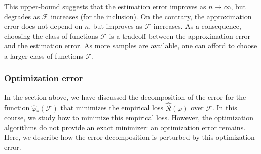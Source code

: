 \documentclass[11pt,reqno]{article}
\newcommand{\cF}{\mathcal{F}}
\newcommand{\cR}{\mathcal{R}}
\numberwithin{equation}{section}
\theoremstyle{plain}
\theoremstyle{definition}
\theoremstyle{remark}
\begin{document}
	This upper-bound suggests that the estimation error improves as $n\to \infty$, but degrades as $\cF$ increases (for the inclusion). On the contrary, the approximation error does not depend on $n$, but improves as $\cF$ increases. As a consequence, choosing the class of functions $\cF$ is a tradeoff between the approximation error and the estimation error. As more samples are available, one can afford to choose a larger class of functions $\cF$. 

	\subsubsection{Optimization error}

	In the section above, we have discussed the decomposition of the error for the function $\widehat{\varphi}_*(\cF)$ that minimizes the empirical loss $\widehat{\cR}(\varphi)$ over $\cF$. In this course, we study how to minimize this empirical loss. However, the optimization algorithms do not provide an exact minimizer: an optimization error remains. Here, we describe how the error decomposition is perturbed by this optimization error.
\end{document}

